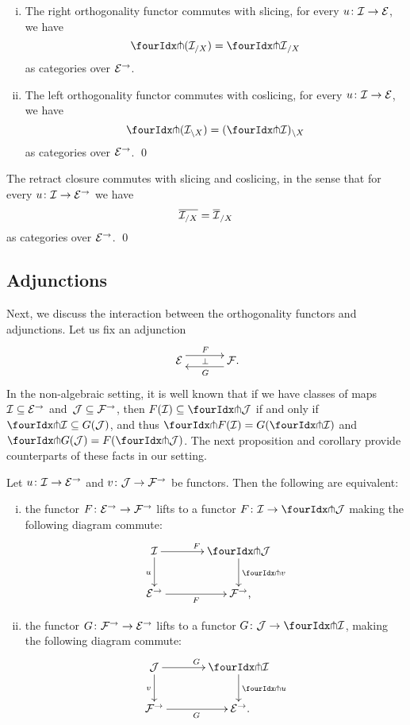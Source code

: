 \documentclass[reqno,10pt,a4paper,oneside]{amsart}
\begin{document}
\begin{proposition}\label{pitchfork-slicing}
\hfill
\begin{enumerate}[(i)]
\item The right orthogonality functor commutes with slicing, \ie for every $u \co \cal{I} \to \cal{E}$, we have
\[
  \liftr{(\cal{I}_{/X})} = {\liftr{\cal{I}}}_{/X}
\]
as categories over $\cal{E}^\to$.
\item The left orthogonality functor commutes with coslicing, \ie for every $u \co \cal{I} \to \cal{E}$, we have
\[
  \liftl{(\cal{I}_{\backslash X})} = (\liftl{\cal{I}})_{ \backslash X}
\]
as categories over $\cal{E}^\to$.
\qed
\end{enumerate}
\end{proposition}



\begin{proposition} The retract closure commutes with slicing and coslicing, in the sense that for every $u \co \cal{I} \to \cal{E}^\to$ we have
\[
\overline{\cal{I}_{/X}} = \overline{\cal{I}}_{/X}
\]
as categories over $\cal{E}^\to$.
\qed
\end{proposition}



\subsection*{Adjunctions} Next, we discuss the interaction between the orthogonality functors and adjunctions.
Let us fix an adjunction
\[
\xymatrix@C+1em{
  \cal{E}
  \ar@<5pt>[r]^{F}
  \ar@{}[r]|{\bot}
&
  \cal{F}
  \ar@<5pt>[l]^{G} \rlap{.}
}
\]
In the non-algebraic setting, it is well known that if we have classes of maps $\cal{I} \subseteq \cal{E}^\to$ and~$\cal{J} \subseteq \cal{F}^\to$, then $F(\cal{I}) \subseteq \liftl{\cal{J}}$ if and only if $\liftr{\cal{I}} \subseteq G(\cal{J})$, and thus $\liftr{F(\cal{I})} = G(\liftr{\cal{I}})$ and $\liftl{G(\cal{J})} = F(\liftl{\cal{J}})$.
The next proposition and corollary provide counterparts of these facts in our setting.

\begin{proposition} \label{lift-of-adjunction}
Let $u \co \cal{I} \to \cal{E}^\to$ and $v \co \cal{J} \to \cal{F}^\to$ be functors.
Then the following are equivalent:
\begin{enumerate}[(i)]
\item the functor $F \co \cal{E}^\to \to \cal{F}^\to$ lifts to a functor $F \co \cal{I} \to \liftl{\cal{J}}$ making the following diagram commute:
\[
\xymatrix@C=1.2cm{
  \cal{I}
  \ar[r]^{F}
  \ar[d]_{u}
&
  \liftl{\cal{J}}
  \ar[d]^{\liftl{v}}
\\
  \cal{E}^\to
  \ar[r]_-{F}
&
  \cal{F}^\to
\rlap{,}}
\]
\item the functor $G \co \cal{F}^\to \to \cal{E}^\to$ lifts to a functor $G \co \cal{J} \to \liftr{\cal{I}}$, making the following diagram commute:
\[
\xymatrix@C=1.2cm{
  \cal{J}
    \ar[d]_{v}
\ar[r]^{G}
&
  \liftr{\cal{I}}
  \ar[d]^{\liftr{u}}
\\
  \cal{F}^\to
   \ar[r]_{G}
&
  \cal{E}^\to
\rlap{.}}
\]
\end{enumerate}
\end{proposition}
\end{document}
